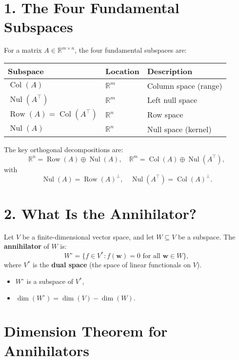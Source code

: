 \documentclass[11pt]{article}
\begin{document}
\section*{1. The Four Fundamental Subspaces}

For a matrix $ A \in \mathbb{R}^{m \times n} $, the four fundamental subspaces are:

\begin{center}
\begin{tabular}{lll}
Subspace & Location & Description \\
\midrule
$ \operatorname{Col}(A) $ & $ \mathbb{R}^m $ & Column space (range) \\
$ \operatorname{Nul}(A^\top) $ & $ \mathbb{R}^m $ & Left null space \\
$ \operatorname{Row}(A) = \operatorname{Col}(A^\top) $ & $ \mathbb{R}^n $ & Row space \\
$ \operatorname{Nul}(A) $ & $ \mathbb{R}^n $ & Null space (kernel)
\end{tabular}
\end{center}

The key orthogonal decompositions are:
\[
\mathbb{R}^n = \operatorname{Row}(A) \oplus \operatorname{Nul}(A), \quad
\mathbb{R}^m = \operatorname{Col}(A) \oplus \operatorname{Nul}(A^\top),
\]
with
\[
\operatorname{Nul}(A) = \operatorname{Row}(A)^\perp, \quad
\operatorname{Nul}(A^\top) = \operatorname{Col}(A)^\perp.
\]

\section*{2. What Is the Annihilator?}

Let $ V $ be a finite-dimensional vector space, and let $ W \subseteq V $ be a subspace.  
The \textbf{annihilator} of $ W $ is:
\[
W^\circ = \{ f \in V^* : f(\mathbf{w}) = 0 \text{ for all } \mathbf{w} \in W \},
\]
where $ V^* $ is the \textbf{dual space} (the space of linear functionals on $ V $).

\begin{itemize}
\item $ W^\circ $ is a subspace of $ V^* $,
    \item $ \dim(W^\circ) = \dim(V) - \dim(W) $.
\end{itemize}

\section*{Dimension Theorem for Annihilators}
\end{document}
